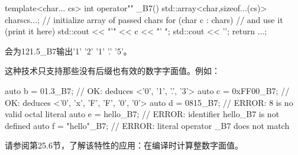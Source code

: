 \begin{cpp}
template<char... cs>
int operator"" _B7()
{
	std::array<char,sizeof...(cs)> chars{cs...}; // initialize array of passed chars
	for (char c : chars) { // and use it (print it here)
		std::cout << "'" << c << "' ";
	}
	std::cout << '\n';
	return ...;
}
\end{cpp}

会为121.5\_B7输出'1' '2' '1' '.' '5'。

这种技术只支持那些没有后缀也有效的数字字面值。例如：

\begin{cpp}
auto b = 01.3_B7; // OK: deduces <'0', '1', '.', '3'>
auto c = 0xFF00_B7; // OK: deduces <'0', 'x', 'F', 'F', '0', '0'>
auto d = 0815_B7; // ERROR: 8 is no valid octal literal
auto e = hello_B7; // ERROR: identifier hello_B7 is not defined
auto f = "hello"_B7; // ERROR: literal operator _B7 does not match
\end{cpp}

请参阅第25.6节，了解该特性的应用：在编译时计算整数字面值。






















